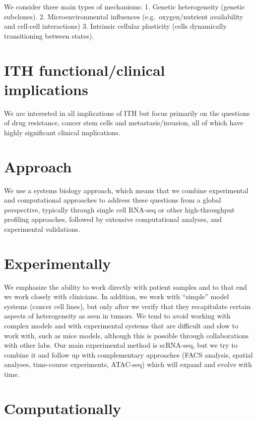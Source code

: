 \documentclass[]{book}
\begin{document}
We consider three main types of mechanisms: 1. Genetic heterogeneity
(genetic subclones). 2. Microenvironmental influences
(e.g.~oxygen/nutrient availability and cell-cell interactions) 3.
Intrinsic cellular plasticity (cells dynamically transitioning between
states).

\section{ITH functional/clinical
implications}\label{ith-functionalclinical-implications}

We are interested in all implications of ITH but focus primarily on the
questions of drug resistance, cancer stem cells and metastasis/invasion,
all of which have highly significant clinical implications.

\section{Approach}\label{approach}

We use a systems biology approach, which means that we combine
experimental and computational approaches to address these questions
from a global perspective, typically through single cell RNA-seq or
other high-throughput profiling approaches, followed by extensive
computational analyses, and experimental validations.

\section{Experimentally}\label{experimentally}

We emphasize the ability to work directly with patient samples and to
that end we work closely with clinicians. In addition, we work with
``simple'' model systems (cancer cell lines), but only after we verify
that they recapitulate certain aspects of heterogeneity as seen in
tumors. We tend to avoid working with complex models and with
experimental systems that are difficult and slow to work with, such as
mice models, although this is possible through collaborations with other
labs. Our main experimental method is scRNA-seq, but we try to combine
it and follow up with complementary approaches (FACS analysis, spatial
analyses, time-course experiments, ATAC-seq) which will expand and
evolve with time.

\section{Computationally}\label{computationally}
\end{document}
